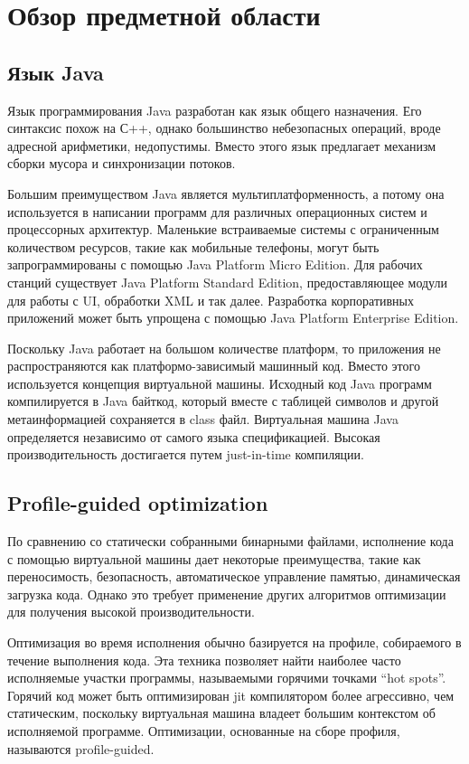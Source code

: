 
\section{Обзор предметной области} \label{view}

\subsection{Язык Java} \label{Java}
Язык программирования Java разработан как язык общего назначения. Его синтаксис похож на С++, однако большинство небезопасных операций, вроде адресной арифметики, недопустимы. Вместо этого язык предлагает механизм сборки мусора и синхронизации потоков.
\par
Большим преимуществом Java является мультиплатформенность, а потому она используется в написании программ для различных операционных систем и процессорных архитектур. 
Маленькие встраиваемые системы с ограниченным количеством ресурсов, такие как мобильные телефоны, могут быть запрограммированы с помощью Java Platform Micro Edition. Для рабочих станций существует Java Platform Standard Edition, предоставляющее модули для работы с UI, обработки XML и так далее. Разработка корпоративных приложений может быть упрощена с помощью Java Platform Enterprise Edition.
\par
Поскольку Java работает на большом количестве платформ, то приложения не распространяются как платформо-зависимый машинный код. Вместо этого используется концепция виртуальной машины. Исходный код Java программ компилируется в Java байткод, который вместе с таблицей символов и другой метаинформацией сохраняется в class файл.  Виртуальная машина Java определяется независимо от самого языка спецификацией\cite{java-spec}. Высокая производительность достигается путем just-in-time компиляции. 

\subsection{Profile-guided optimization} \label{pgo}
По сравнению со статически собранными бинарными файлами, исполнение кода с помощью виртуальной машины дает некоторые преимущества, такие как переносимость, безопасность, автоматическое управление памятью, динамическая загрузка кода. Однако это требует применение других алгоритмов оптимизации для получения высокой производительности.
\par
Оптимизация во время исполнения обычно базируется на профиле, собираемого в течение выполнения кода. 
Эта техника позволяет найти наиболее часто исполняемые участки программы, называемыми горячими точками “hot spots”. Горячий код может быть оптимизирован jit компилятором более агрессивно, чем статическим, поскольку виртуальная машина владеет большим контекстом об исполняемой программе. Оптимизации, основанные на сборе профиля, называются profile-guided.

